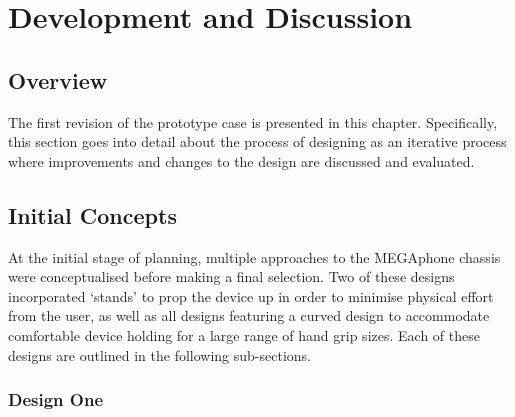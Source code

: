 
\chapter{Development and Discussion} %

\label{Chapter4} %


\section{Overview}

The first revision of the prototype case is presented in this chapter.
Specifically, this section goes into detail about the process of designing as an iterative process where improvements and changes to the design are discussed and evaluated.



\section{Initial Concepts}

At the initial stage of planning, multiple approaches to the MEGAphone chassis were conceptualised before making a final selection. 
Two of these designs incorporated ‘stands’ to prop the device up in order to minimise physical effort from the user, as well as all designs featuring a curved design to accommodate comfortable device holding for a large range of hand grip sizes. 
Each of these designs are outlined in the following sub-sections.

\subsection{Design One}


